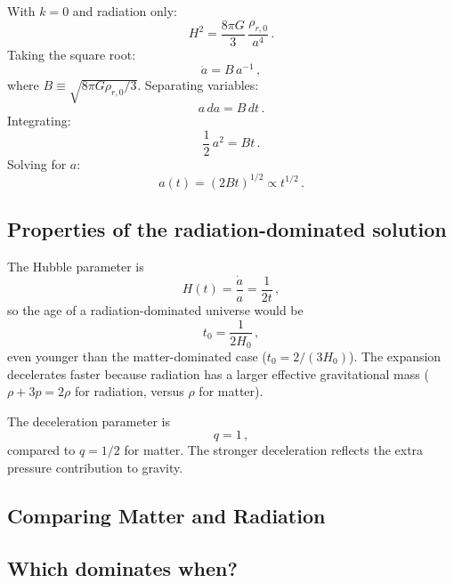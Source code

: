 With $k=0$ and radiation only:
\begin{equation}
    H^2 = \frac{8\pi G}{3}\,\frac{\rho_{r,0}}{a^4}\,.
\end{equation}
Taking the square root:
\begin{equation}
    \dot{a} = B\,a^{-1}\,,
\end{equation}
where $B\equiv\sqrt{8\pi G\rho_{r,0}/3}$. Separating variables:
\begin{equation}
    a\,da = B\,dt\,.
\end{equation}
Integrating:
\begin{equation}
    \frac{1}{2}\,a^2 = Bt\,.
\end{equation}
Solving for $a$:
\begin{equation}
\boxed{a(t) = (2Bt)^{1/2} \propto t^{1/2}\,.}
\end{equation}

\subsection*{Properties of the radiation-dominated solution}

The Hubble parameter is
\begin{equation}
    H(t) = \frac{\dot{a}}{a} = \frac{1}{2t}\,,
\end{equation}
so the age of a radiation-dominated universe would be
\begin{equation}
    t_0 = \frac{1}{2H_0}\,,
\end{equation}
even younger than the matter-dominated case ($t_0=2/(3H_0)$). The expansion decelerates faster because radiation has a larger effective gravitational mass ($\rho+3p=2\rho$ for radiation, versus $\rho$ for matter).

The deceleration parameter is
\begin{equation}
    q = 1\,,
\end{equation}
compared to $q=1/2$ for matter. The stronger deceleration reflects the extra pressure contribution to gravity.


\subsection{Comparing Matter and Radiation}

\subsection*{Which dominates when?}

